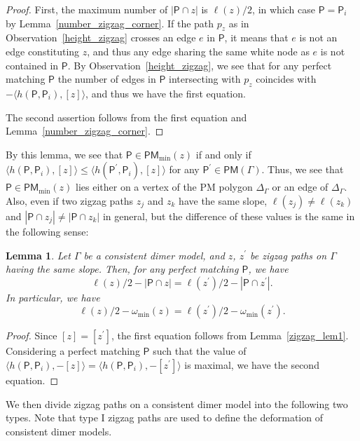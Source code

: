 \documentclass[11pt]{article}
\numberwithin{equation}{section}
\numberwithin{equation}{section}
\numberwithin{figure}{section}
\numberwithin{table}{section}
\newtheorem{Lemma}[Theorem]{Lemma}
\newcommand{\sfP}{\mathsf{P}}
\newcommand{\PM}{\mathsf{PM}}
\begin{document}
\begin{proof}
First, the maximum number of $|\sfP\cap z|$ is $\ell(z)/2$, in which case $\sfP=\sfP_i$ by Lemma~\ref{number_zigzag_corner}.
If the path $p_z$ as in Observation~\ref{height_zigzag} crosses an edge $e$ in $\sfP$, it means that $e$ is not an edge constituting $z$, and thus any edge sharing the same white node as $e$ is not contained in $\sfP$.
By Observation~\ref{height_zigzag}, we see that for any perfect matching $\sfP$ the number of edges in $\sfP$ intersecting with $p_z$ coincides with $-\langle h(\sfP,\sfP_i),[z]\rangle$, and thus we have the first equation.

The second assertion follows from the first equation and Lemma~\ref{number_zigzag_corner}.
\end{proof}

By this lemma, we see that $\sfP\in\PM_{\min}(z)$ if and only if $\langle h(\sfP,\sfP_i),[z]\rangle{\le} \langle h(\sfP^\prime,\sfP_i),[z]\rangle$ for any $\sfP^\prime\in\PM(\Gamma)$.
Thus, we see that $\sfP\in\PM_{\min}(z)$ lies either on a vertex of the PM polygon $\Delta_\Gamma$ or an edge of $\Delta_\Gamma$.
Also, even if two zigzag paths $z_j$ and $z_k$ have the same slope, $\ell(z_j)\neq\ell(z_k)$ and $|\sfP\cap z_j|\neq|\sfP\cap z_k|$ in general,
but the difference of these values is the same in the following sense:

\begin{Lemma}\label{zigzag_lem2}
Let $\Gamma$ be a consistent dimer model, and $z$, $z^\prime$ be zigzag paths on $\Gamma$ having the same slope.
Then, for any perfect matching $\sfP$, we have
\begin{displaymath}
\ell(z)/2-|\sfP\cap z|=\ell(z^\prime)/2-|\sfP\cap z^\prime|.
\end{displaymath}
In particular, we have
\begin{displaymath}
\ell(z)/2-\omega_{\min}(z)=\ell(z^\prime)/2-\omega_{\min}(z^\prime).
\end{displaymath}
\end{Lemma}

\begin{proof}Since $[z]=[z^\prime]$, the first equation follows from Lemma~\ref{zigzag_lem1}.
Considering a perfect matching $\sfP$ such that the value of $\langle h(\sfP,\sfP_i),-[z]\rangle=\langle h(\sfP,\sfP_i),-[z^\prime]\rangle$ is maximal, we have the second equation.
\end{proof}

We then divide zigzag paths on a consistent dimer model into the following two types. Note that type I zigzag paths are used to define the deformation of consistent dimer models.
\end{document}
